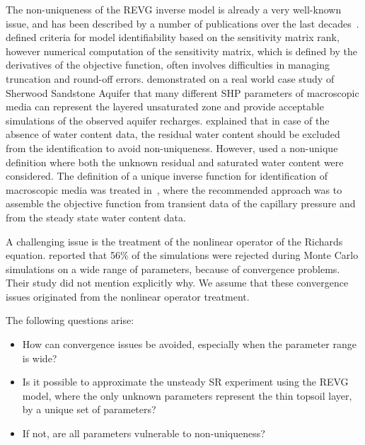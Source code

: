 \documentclass[review,times,3p,10pt]{elsarticle}
\begin{document}
The non-uniqueness of the REVG inverse model is already a very well-known issue, and has been described by a number of publications over the last decades~\citep{kool1985, mous1993, ihlwang2003, beven2003-uncertain,Kowalsky04,Nakhaei, Kamali,pena17}.
\cite{mous1993} defined criteria for model identifiability based on the sensitivity matrix rank, however numerical computation of the sensitivity matrix, which is defined by the derivatives of the objective function, often involves difficulties in managing truncation and round-off errors.
\cite{beven2003-uncertain} demonstrated on a real world case study of Sherwood Sandstone Aquifer that many different SHP parameters of macroscopic media can represent the layered unsaturated zone and provide acceptable simulations of the observed aquifer recharges.  \cite{mous1993} explained that in case of the absence of water content data, the residual water content should be excluded from the identification to avoid non-uniqueness. However, \cite{beven2003-uncertain} used
a non-unique definition where both the unknown residual and saturated water content were considered.
The definition of a unique inverse function for identification of macroscopic media was treated in~\citep{zou200126}, where the recommended approach was to assemble the objective function from transient data of the capillary pressure and from the steady state water content data. %

A challenging issue is the treatment of the nonlinear operator of the Richards equation. \cite{beven2003-uncertain} reported that 56\% of the simulations were rejected during Monte Carlo simulations on a wide range of parameters, because of convergence problems. 
Their study did not mention explicitly why. We assume that these convergence issues originated from the nonlinear operator treatment.

The following questions arise: 
\begin{itemize}
\item How can convergence issues be avoided, especially when the parameter range is wide? 
\item Is it possible to approximate the unsteady SR experiment using the REVG model, where the only unknown parameters represent the thin topsoil layer, by a unique set of parameters? 
\item  If not, are all parameters vulnerable to non-uniqueness?
\end{itemize}
\end{document}
